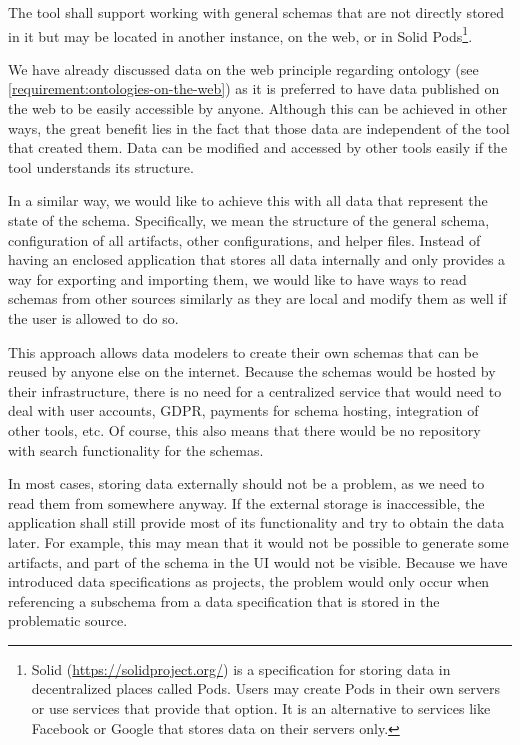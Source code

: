 \begin{requirement}
    The tool shall support working with general schemas that are not directly stored in it but may be located in another instance, on the web, or in Solid Pods\footnote{Solid (\url{https://solidproject.org/}) is a specification for storing data in decentralized places called Pods. Users may create Pods in their own servers or use services that provide that option. It is an alternative to services like Facebook or Google that stores data on their servers only.}.
    \label{requirement:schemas-on-the-web}
\end{requirement}

We have already discussed data on the web principle regarding ontology (see \autoref{requirement:ontologies-on-the-web}) as it is preferred to have data published on the web to be easily accessible by anyone. Although this can be achieved in other ways, the great benefit lies in the fact that those data are independent of the tool that created them. Data can be modified and accessed by other tools easily if the tool understands its structure.

In a similar way, we would like to achieve this with all data that represent the state of the schema. Specifically, we mean the structure of the general schema, configuration of all artifacts, other configurations, and helper files. Instead of having an enclosed application that stores all data internally and only provides a way for exporting and importing them, we would like to have ways to read schemas from other sources similarly as they are local and modify them as well if the user is allowed to do so.

This approach allows data modelers to create their own schemas that can be reused by anyone else on the internet. Because the schemas would be hosted by their infrastructure, there is no need for a centralized service that would need to deal with user accounts, GDPR, payments for schema hosting, integration of other tools, etc. Of course, this also means that there would be no repository with search functionality for the schemas.

\medskip

In most cases, storing data externally should not be a problem, as we need to read them from somewhere anyway. If the external storage is inaccessible, the application shall still provide most of its functionality and try to obtain the data later. For example, this may mean that it would not be possible to generate some artifacts, and part of the schema in the UI would not be visible. Because we have introduced data specifications as projects, the problem would only occur when referencing a subschema from a data specification that is stored in the problematic source.

